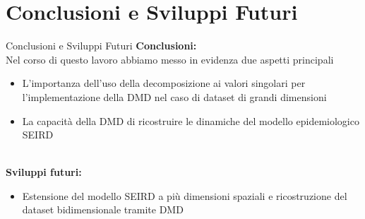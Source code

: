 \documentclass[serif]{beamer}
\begin{document}
\begin{frame}
    \begin{center}
    \end{center}
\end{frame}

\section{Conclusioni e Sviluppi Futuri}
\begin{frame}{Conclusioni e Sviluppi Futuri}
\textbf{Conclusioni:} \\
Nel corso di questo lavoro abbiamo messo in evidenza due aspetti principali
\begin{itemize}
    \item L'importanza dell'uso della decomposizione ai valori singolari per l'implementazione della DMD nel caso di dataset di grandi dimensioni
    \item La capacità della DMD di ricostruire le dinamiche del modello epidemiologico SEIRD 
\end{itemize} \\ 
\textbf{Sviluppi futuri:}
\begin{itemize}
    \item Estensione del modello SEIRD a più dimensioni spaziali e ricostruzione del dataset bidimensionale tramite DMD
\end{itemize}
\end{frame}
\end{document}

